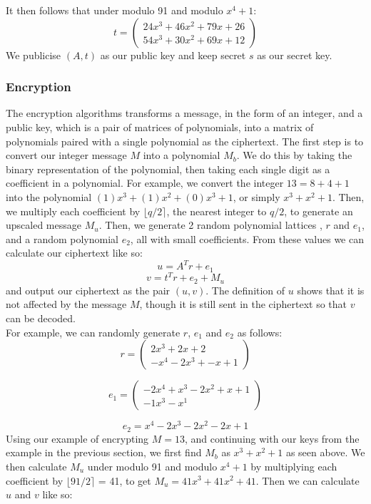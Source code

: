 \documentclass{article}
\newcommand{\round}[1]{\ensuremath{\lfloor#1\rceil}}
\begin{document}
It then follows that under modulo 91 and modulo $x^4 + 1$:
\[
   t = \begin{pmatrix}
      24x^3 + 46x^2 + 79x + 26 \\
      54x^3 + 30x^2 + 69x + 12
       \end{pmatrix}
\]
We publicise $(A, t)$ as our public key and keep secret $s$ as our secret key.

\subsubsection{Encryption}
The encryption algorithms transforms a message, in the form of an integer, and a public key, which is a pair of matrices of polynomials,
into a matrix of polynomials paired with a single polynomial as the ciphertext.
\medskip
The first step is to convert our integer message $M$ into a polynomial $M_{b}$. We do this by taking the binary representation of the polynomial,
then taking each single digit as a coefficient in a polynomial. For example, we convert the integer $13 = 8 + 4 + 1$ into the polynomial
$(1)x^{3} + (1)x^{2} + (0)x^{3} + 1$, or simply $x^{3} + x^{2} + 1$.
Then, we multiply each coefficient by $\round{q/2}$, the nearest integer to $q/2$, to generate an upscaled message $M_{u}$.
Then, we generate 2 random polynomial lattices , $r$ and $e_{1}$, and a random polynomial $e_{2}$, all with small coefficients.
From these values we can calculate our ciphertext like so:
\[u = A^{T}r + e_{1}\]
\[v = t^{T}r + e_{2} + M_{u}\]
and output our ciphertext as the pair $(u, v)$. The definition of $u$ shows that it is not affected by the message $M$, though it is still
sent in the ciphertext so that $v$ can be decoded.
\\
For example, we can randomly generate $r$, $e_{1}$ and $e_{2}$ as follows:
\[
   r = \begin{pmatrix}
         2x^3 + 2x + 2 \\
         -x^4 -2x^3 + -x + 1
       \end{pmatrix}
\]

\[
   e_{1} = \begin{pmatrix}
            -2x^4 + x^3 -2x^2 + x + 1 \\
            -1x^3 -x^1
           \end{pmatrix}
\]

\[
   e_{2} = x^4 -2x^3 -2x^2 -2x + 1
\]
Using our example of encrypting $M = 13$, and continuing with our keys from the example in the previous section, we first find $M_{b}$ as $x^{3} + x^{2} + 1$ as seen above.
We then calculate $M_{u}$ under modulo 91 and modulo $x^4 + 1$ by multiplying each coefficient by $\round{91/2}$ = 41, to get $M_{u} = 41x^3 + 41x^2 + 41$. Then we can calculate $u$ and $v$ like so:
\end{document}
